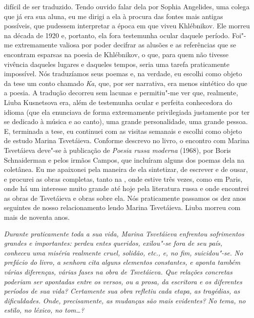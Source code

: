 difícil de ser traduzido. Tendo ouvido falar dela por Sophia Angelides,
uma colega que já era sua aluna, eu me dirigi a ela à procura das fontes
mais antigas possíveis, que pudessem interpretar a época em que viveu
Khlébnikov. Ele morreu na década de 1920 e, portanto, ela fora
testemunha ocular daquele período. Foi"-me extremamente valiosa por poder
decifrar as alusões e as referências que se encontram esparsas na poesia
de Khlébnikov, o que, para quem não tivesse vivência daqueles lugares e
daqueles tempos, seria uma tarefa praticamente impossível. Nós
traduzíamos seus poemas e, na verdade, eu escolhi como objeto da tese um
conto chamado \emph{Ka}, que, por ser narrativa, era menos sintético do
que a poesia. A tradução decorreu sem lacunas e permitiu"-me ver que,
realmente, Liuba Kusnetsova era, além de testemunha ocular e perfeita
conhecedora do idioma (que ela enunciava de forma extremamente
privilegiada justamente por ter se dedicado à música e ao canto), uma
grande personalidade, uma grande pessoa. E, terminada a tese, eu
continuei com as visitas semanais e escolhi como objeto de estudo Marina
Tsvetáieva. Conforme descrevo no livro, o encontro com Marina Tsvetáieva
deve"-se à publicação de \emph{Poesia russa moderna} (1968), por Boris
Schnaiderman e pelos irmãos Campos, que incluíram alguns dos poemas dela na coletânea. Eu me apaixonei pela maneira de ela sintetizar, de
escrever e de ousar, e procurei as obras completas, tanto na , onde
estive três vezes, como em Paris, onde há um interesse muito grande até
hoje pela literatura russa e onde encontrei as obras de Tsvetáieva e
obras sobre ela. Nós praticamente passamos os dez anos seguintes de
nosso relacionamento lendo Marina Tsvetáieva. Liuba morreu com mais de
noventa anos.

\medskip

\emph{Durante praticamente toda a sua vida, Marina
Tsvetáieva enfrentou sofrimentos grandes e importantes: perdeu entes
queridos, exilou"-se fora de seu país, conheceu uma miséria realmente
cruel, solidão, etc., e, no fim, suicidou"-se. No prefácio do livro, a
senhora cita alguns elementos constantes, e aponta também várias
diferenças, várias fases na obra de Tsvetáieva. Que relações concretas
poderiam ser apontadas entre os versos, ou a prosa, da escritora e os
diferentes períodos de sua vida? Certamente sua obra refletiu cada
etapa, as tragédias, as dificuldades. Onde, precisamente, as mudanças
são mais evidentes? No tema, no estilo, no léxico, no tom\ldots{}?}

